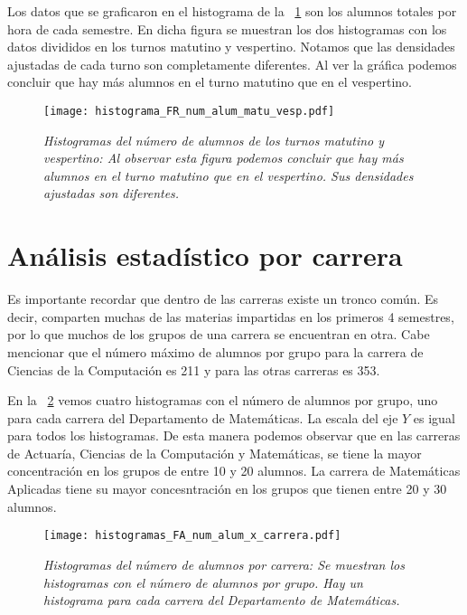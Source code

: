 Los datos que se graficaron en el histograma de la \figurename{~\ref{histNumAlTotal_MatuVesp}} son los alumnos totales por hora de cada semestre. En dicha figura se muestran los dos histogramas con los datos divididos en los turnos matutino y vespertino. Notamos que las densidades ajustadas de cada turno son completamente diferentes. Al ver la gráfica podemos concluir que hay más alumnos en el turno matutino que en el vespertino.

\begin{figure}[H]
\centering
\texttt{[image: histograma\_FR\_num\_alum\_matu\_vesp.pdf]} %
\caption[\textit{Histogramas del número de alumnos de los turnos matutino y vespertino}]{\textit{Histogramas del número de alumnos de los turnos matutino y vespertino: Al observar esta figura podemos concluir que hay más alumnos en el turno matutino que en el vespertino. Sus densidades ajustadas son diferentes.}}\label{histNumAlTotal_MatuVesp}
\end{figure}


\section{Análisis estadístico por carrera}

Es importante recordar que dentro de las carreras existe un tronco común. Es decir, comparten muchas de las materias impartidas en los primeros 4 semestres, por lo que muchos de los grupos de una carrera se encuentran en otra. Cabe mencionar que el número máximo de alumnos por grupo para la carrera de Ciencias de la Computación es 211 y para las otras carreras es 353.

En la \figurename{~\ref{histFAnumAl_x_carrera}} vemos cuatro histogramas con el número de alumnos por grupo, uno para cada carrera del Departamento de Matemáticas. La escala del eje $Y$ es igual para todos los histogramas. De esta manera podemos observar que en las carreras de Actuaría, Ciencias de la Computación y Matemáticas, se tiene la mayor concentración en los grupos de entre 10 y 20 alumnos. La carrera de Matemáticas Aplicadas tiene su mayor concesntración en los grupos que tienen entre 20 y 30 alumnos.

\begin{figure}[H]
\centering
\texttt{[image: histogramas\_FA\_num\_alum\_x\_carrera.pdf]} %
\caption[\textit{Histogramas del número de alumnos por carrera}]{\textit{Histogramas del número de alumnos por carrera: Se muestran los histogramas con el número de alumnos por grupo. Hay un histograma para cada carrera del Departamento de Matemáticas.}}\label{histFAnumAl_x_carrera}
\end{figure}


